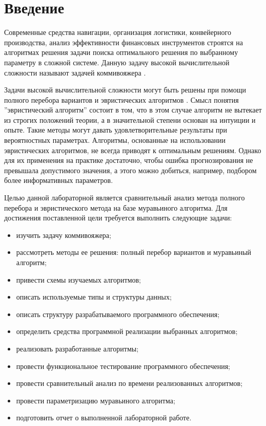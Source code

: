 \chapter*{Введение}

Современные средства навигации, организация логистики, конвейерного производства, анализ эффективности финансовых инструментов строятся на алгоритмах решения задачи поиска оптимального решения по выбранному параметру в сложной системе.
Данную задачу высокой вычислительной сложности называют задачей коммивояжера \cite{task}.

Задачи высокой вычислительной сложности могут быть решены при помощи полного перебора вариантов и эвристических алгоритмов \cite{evr}. Смысл понятия ''эвристический алгоритм'' состоит в том, что в этом случае алгоритм не вытекает из строгих положений теории, а в значительной степени основан на интуиции и опыте. Такие методы могут давать удовлетворительные результаты при вероятностных параметрах. Алгоритмы, основанные на использовании эвристических алгоритмов, не всегда приводят к оптимальным решениям. Однако для их применения на практике достаточно, чтобы ошибка прогнозирования не превышала допустимого значения, а этого можно добиться, например, подбором более информативных параметров.

Целью данной лабораторной является сравнительный анализ метода полного перебора и эвристического метода на базе муравьиного алгоритма. Для достижения поставленной цели требуется выполнить следующие задачи:

\begin{itemize}
	\item изучить задачу коммивояжера;
	\item рассмотреть методы ее решения: полный перебор вариантов и муравьиный алгоритм;
	\item привести схемы изучаемых алгоритмов;
	\item описать используемые типы и структуры данных;
	\item описать структуру разрабатываемого программного обеспечения;
	\item определить средства программной реализации выбранных алгоритмов;
	\item реализовать разработанные алгоритмы;
	\item провести функциональное тестирование программного обеспечения;
	\item провести сравнительный анализ по времени реализованных алгоритмов;
	\item провести параметризацию муравьиного алгоритма;
	\item подготовить отчет о выполненной лабораторной работе.
\end{itemize}